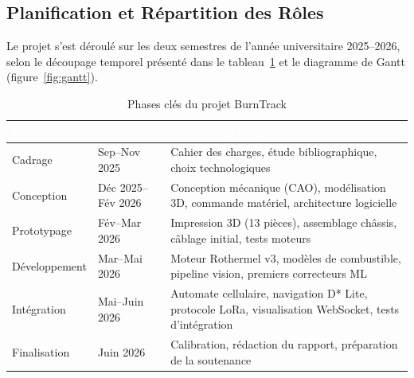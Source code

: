 \documentclass[a4paper,12pt,openany,titlepage]{scrartcl}
\begin{document}
\subsection{Planification et Répartition des Rôles}

Le projet s'est déroulé sur les deux semestres de l'année universitaire 2025--2026, selon le découpage temporel présenté dans le tableau~\ref{tab:phases} et le diagramme de Gantt (figure~\ref{fig:gantt}).

\begin{table}[H]
\centering
\caption{Phases clés du projet BurnTrack}
\label{tab:phases}
\begin{tabularx}{\textwidth}{|l|l|X|}
\hline
\rowcolor{NavyBlue} \textcolor{white}{\textbf{Phase}} & \textcolor{white}{\textbf{Période}} & \textcolor{white}{\textbf{Activités principales}} \\
\hline
Cadrage & Sep--Nov 2025 & Cahier des charges, étude bibliographique, choix technologiques \\
\hline
Conception & Déc 2025--Fév 2026 & Conception mécanique (CAO), modélisation 3D, commande matériel, architecture logicielle \\
\hline
Prototypage & Fév--Mar 2026 & Impression 3D (13 pièces), assemblage châssis, câblage initial, tests moteurs \\
\hline
Développement & Mar--Mai 2026 & Moteur Rothermel v3, modèles de combustible, pipeline vision, premiers correcteurs ML \\
\hline
Intégration & Mai--Juin 2026 & Automate cellulaire, navigation D* Lite, protocole LoRa, visualisation WebSocket, tests d'intégration \\
\hline
Finalisation & Juin 2026 & Calibration, rédaction du rapport, préparation de la soutenance \\
\hline
\end{tabularx}
\end{table}
\end{document}
